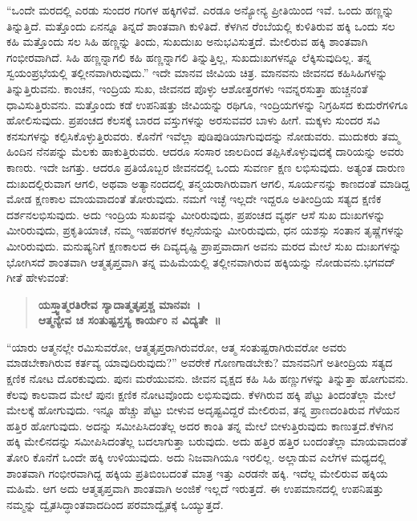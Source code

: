 \vskip 4pt

“ಒಂದೇ ಮರದಲ್ಲಿ ಎರಡು ಸುಂದರ ಗರಿಗಳ ಹಕ್ಕಿಗಳಿವೆ. ಎರಡೂ ಅನ್ಯೋನ್ಯ ಪ್ರೀತಿಯಿಂದ ಇವೆ. ಒಂದು ಹಣ್ಣನ್ನು ತಿನ್ನುತ್ತಿದೆ. ಮತ್ತೊಂದು ಏನನ್ನೂ ತಿನ್ನದೆ ಶಾಂತವಾಗಿ ಕುಳಿತಿದೆ. ಕೆಳಗಿನ ರೆಂಬೆಯಲ್ಲಿ ಕುಳಿತಿರುವ ಹಕ್ಕಿ ಒಂದು ಸಲ ಕಹಿ ಮತ್ತೊಂದು ಸಲ ಸಿಹಿ ಹಣ್ಣನ್ನು ತಿಂದು, ಸುಖದುಃಖ ಅನುಭವಿಸುತ್ತದೆ. ಮೇಲಿರುವ ಹಕ್ಕಿ ಶಾಂತವಾಗಿ ಗಂಭೀರವಾಗಿದೆ. ಸಿಹಿ ಹಣ್ಣ\-ನ್ನಾಗಲಿ ಕಹಿ ಹಣ್ಣನ್ನಾಗಲಿ ತಿನ್ನುತ್ತಿಲ್ಲ, ಸುಖದುಃಖಗಳನ್ನೂ ಲೆಕ್ಕಿಸುವುದಿಲ್ಲ. ತನ್ನ ಸ್ವಯಂಪ್ರಭೆಯಲ್ಲಿ ತಲ್ಲೀನವಾಗಿರುವುದು.” ಇದೇ ಮಾನವ ಜೀವಿಯ ಚಿತ್ರ. ಮಾನವನು ಜೀವನದ ಕಹಿಸಿಹಿಗಳನ್ನು ತಿನ್ನುತ್ತಿರುವನು. ಕಾಂಚನ, ಇಂದ್ರಿಯ ಸುಖ, ಜೀವನದ ಪೊಳ್ಳು ಆಶೋತ್ತರಗಳು ಇವನ್ನರಸುತ್ತಾ ಹುಚ್ಚನಂತೆ ಧಾವಿಸು\-ತ್ತಿರುವನು. ಮತ್ತೊಂದು ಕಡೆ ಉಪನಿಷತ್ತು ಜೀವಿಯನ್ನು ರಥಿಗೂ, ಇಂದ್ರಿಯಗಳನ್ನು ನಿಗ್ರಹಿಸದ ಕುದುರೆಗಳಿಗೂ ಹೋಲಿಸುವುದು. ಪ್ರಪಂಚದ ಕೆಲಸಕ್ಕೆ ಬಾರದ ವಸ್ತುಗಳನ್ನು ಅರಸುವವರ ಬಾಳು ಹೀಗೆ. ಮಕ್ಕಳು ಸುಂದರ ಸವಿ ಕನಸುಗಳನ್ನು ಕಲ್ಪಿಸಿಕೊಳ್ಳುತ್ತಿರುವರು. ಕೊನೆಗೆ ಇವೆಲ್ಲಾ ಪುಡಿಪುಡಿಯಾಗುವುದನ್ನು ನೋಡುವರು. ಮುದುಕರು ತಮ್ಮ ಹಿಂದಿನ ನೆನಪನ್ನು ಮೆಲಕು ಹಾಕುತ್ತಿರುವರು. ಆದರೂ ಸಂಸಾರ ಜಾಲದಿಂದ ತಪ್ಪಿಸಿಕೊಳ್ಳುವುದಕ್ಕೆ ದಾರಿಯನ್ನು ಅವರು ಕಾಣರು. ಇದೇ ಜಗತ್ತು. ಆದರೂ ಪ್ರತಿಯೊಬ್ಬರ ಜೀವನದಲ್ಲಿ ಒಂದು ಸುವರ್ಣ ಕ್ಷಣ ಲಭಿಸುವುದು. ಅತ್ಯಂತ ದಾರುಣ ದುಃಖದಲ್ಲಿರುವಾಗ ಆಗಲಿ, ಅಥವಾ ಅತ್ಯಾನಂದದಲ್ಲಿ ತನ್ಮಯರಾಗಿರುವಾಗ ಆಗಲಿ, ಸೂರ್ಯನನ್ನು ಕಾಣದಂತೆ ಮಾಡಿದ್ದ ಮೋಡ ಕ್ಷಣಕಾಲ ಮಾಯವಾದಂತೆ ತೋರುವುದು. ನಮಗೆ ಇಚ್ಛೆ ಇಲ್ಲದೇ ಇದ್ದರೂ ಅತೀಂದ್ರಿಯ ಸತ್ಯದ ಕ್ಷಣಿಕ ದರ್ಶನ\break ಲಭಿಸುವುದು. ಅದು ಇಂದ್ರಿಯ ಸುಖವನ್ನು ಮೀರಿರುವುದು, ಪ್ರಪಂಚದ ವ್ಯರ್ಥ ಆಸೆ ಸುಖ ದುಃಖಗಳನ್ನು ಮೀರಿರುವುದು, ಪ್ರಕೃತಿಯಾಚೆ, ನಮ್ಮ ಇಹಪರಗಳ ಕಲ್ಪನೆಯನ್ನು ಮೀರಿರುವುದು, ಧನ ಯಶಸ್ಸು ಸಂತಾನ ತೃಷ್ಣೆಗಳನ್ನು ಮೀರಿರುವುದು. ಮನುಷ್ಯನಿಗೆ ಕ್ಷಣಕಾಲದ ಈ ದಿವ್ಯದೃಷ್ಟಿ ಪ್ರಾಪ್ತವಾದಾಗ ಅವನು ಮರದ ಮೇಲೆ ಸುಖ ದುಃಖಗಳನ್ನು ಭೋಗಿಸದೆ ಶಾಂತವಾಗಿ ಆತ್ಮತೃಪ್ತವಾಗಿ ತನ್ನ ಮಹಿಮೆಯಲ್ಲಿ ತಲ್ಲೀನವಾಗಿರುವ ಹಕ್ಕಿಯನ್ನು ನೋಡುವನು.\break ಭಗವದ್​ಗೀತೆ ಹೇಳುವಂತೆ:

\begin{verse}
\textbf{ಯಸ್ತ್ವಾತ್ಮರತಿರೇವ ಸ್ಯಾದಾತ್ಮತೃಪ್ತಶ್ಚ ಮಾನವಃ~।}\\\textbf{ಆತ್ಮನ್ಯೇವ ಚ ಸಂತುಷ್ಟಸ್ತಸ್ಯ ಕಾರ್ಯಂ ನ ವಿದ್ಯತೇ~॥}
\end{verse}

“ಯಾರು ಆತ್ಮನಲ್ಲೇ ರಮಿಸುವರೋ, ಆತ್ಮತೃಪ್ತರಾಗಿರುವರೋ, ಆತ್ಮ ಸಂತುಷ್ಟರಾಗಿರುವರೋ ಅವರು ಮಾಡಬೇಕಾಗಿರುವ ಕರ್ತವ್ಯ ಯಾವುದಿರುವುದು?” ಅವರೇಕೆ ಗೊಣಗಾಡಬೇಕು? ಮಾನವನಿಗೆ ಅತೀಂದ್ರಿಯ ಸತ್ಯದ ಕ್ಷಣಿಕ ನೋಟ ದೊರಕುವುದು. ಪುನಃ ಮರೆಯುವನು. ಜೀವನ ವೃಕ್ಷದ ಕಹಿ ಸಿಹಿ ಹಣ್ಣುಗಳನ್ನು ತಿನ್ನುತ್ತಾ ಹೋಗುವನು. ಕೆಲವು ಕಾಲವಾದ ಮೇಲೆ ಪುನಃ ಕ್ಷಣಿಕ ನೋಟವೊಂದು ಲಭಿಸುವುದು. ಕೆಳಗಿರುವ ಹಕ್ಕಿ ಪೆಟ್ಟು ತಿಂದಂತೆಲ್ಲಾ ಮೇಲೆ ಮೇಲಕ್ಕೆ ಹೋಗುವುದು. ಇನ್ನೂ ಹೆಚ್ಚು ಪೆಟ್ಟು ಬೀಳುವ ಅದೃಷ್ಟವಿದ್ದರೆ ಮೇಲಿರುವ, ತನ್ನ ಪ್ರಾಣದಂತಿರುವ ಗೆಳೆಯನ ಹತ್ತಿರ ಹೋಗುವುದು. ಅದನ್ನು ಸಮೀಪಿಸಿದಂತೆಲ್ಲ ಅದರ ಕಾಂತಿ ತನ್ನ ಮೇಲೆ ಬೀಳುತ್ತಿರುವುದು ಕಾಣುತ್ತದೆ.\break ಕೆಳಗಿನ ಹಕ್ಕಿ ಮೇಲಿನದನ್ನು ಸಮೀಪಿಸಿದಂತೆಲ್ಲ ಬದಲಾಗುತ್ತಾ ಬರುವುದು. ಅದು ಹತ್ತಿರ ಹತ್ತಿರ ಬಂದಂತೆಲ್ಲಾ ಮಾಯವಾದಂತೆ ತೋರಿ ಕೊನೆಗೆ ಒಂದೇ ಹಕ್ಕಿ ಉಳಿಯುವುದು. ಅದು ನಿಜವಾಗಿಯೂ ಇರಲಿಲ್ಲ. ಅಲ್ಲಾಡುವ ಎಲೆಗಳ ಮಧ್ಯದಲ್ಲಿ ಶಾಂತವಾಗಿ ಗಂಭೀರವಾಗಿದ್ದ ಹಕ್ಕಿಯ ಪ್ರತಿಬಿಂಬದಂತೆ ಮಾತ್ರ ಇತ್ತು ಎರಡನೇ ಹಕ್ಕಿ. ಇದೆಲ್ಲ ಮೇಲಿರುವ ಹಕ್ಕಿಯ ಮಹಿಮೆ. ಆಗ ಅದು ಆತ್ಮತೃಪ್ತವಾಗಿ ಶಾಂತವಾಗಿ ಅಂಜಿಕೆ ಇಲ್ಲದೆ ಇರುತ್ತದೆ. ಈ ಉಪಮಾನದಲ್ಲಿ ಉಪನಿಷತ್ತು ನಮ್ಮನ್ನು ದ್ವೈತಸಿದ್ಧಾಂತವಾದದಿಂದ ಪರಮಾದ್ವೈತಕ್ಕೆ ಒಯ್ಯುತ್ತದೆ.

